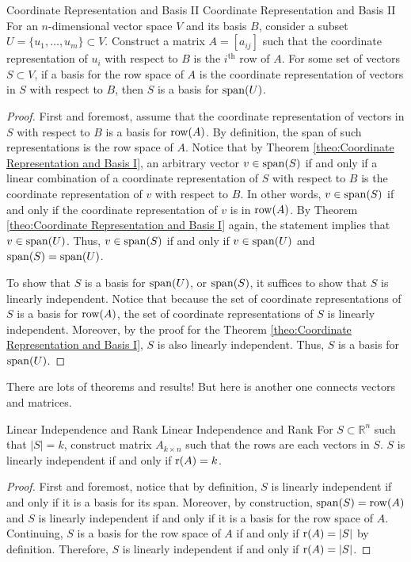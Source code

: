 \documentclass[../main.tex]{subfiles}
\begin{document}
\begin{theorem}{Coordinate Representation and Basis II}
{Coordinate Representation and Basis II}
For an $n$-dimensional vector space $V$ and its basis $B$, consider a
subset $U = \{ u_1, \ldots, u_m \} \subset V$. Construct a matrix
$A = [a_{ij}]$ such that the coordinate representation of $u_i$ with
respect to $B$ is the $i^{\text{th}}$ row of $A$. For some set of
vectors $S \subset V$, if a basis for the row space of $A$ is the
coordinate representation of vectors in $S$ with respect to $B$,
then $S$ is a basis for $\operatorname{span}(U)$.
\end{theorem}
\begin{proof}
First and foremost, assume that the coordinate representation of
vectors in $S$ with respect to $B$ is a basis for $\operatorname{row}(A)$.
By definition, the span of such representations is the row space
of $A$. Notice that by Theorem \ref{theo:Coordinate Representation and
Basis I}, an arbitrary vector $v \in \operatorname{span}(S)$ if and only if a linear
combination of a coordinate representation of $S$ with respect to $B$
is the coordinate representation of $v$ with respect to $B$. In other
words, $v \in \operatorname{span}(S)$ if and only if the coordinate representation
of $v$ is in $\operatorname{row}(A)$. By Theorem \ref{theo:Coordinate Representation
and Basis I} again, the statement implies that $v \in \operatorname{span}(U)$.
Thus, $v \in \operatorname{span}(S)$ if and only if $v \in \operatorname{span}(U)$ and $\operatorname{span}(S)
= \operatorname{span}(U)$.

To show that $S$ is a basis for $\operatorname{span}(U)$, or $\operatorname{span}(S)$, it suffices
to show that $S$ is linearly independent. Notice that because the set
of coordinate representations of $S$ is a basis for $\operatorname{row}(A)$, the set
of coordinate representations of $S$ is linearly independent.
Moreover, by the proof for the Theorem \ref{theo:Coordinate
Representation and Basis I}, $S$ is also linearly independent. Thus,
$S$ is a basis for $\operatorname{span}(U)$.
\end{proof}

There are lots of theorems and results! But here is another one
connects vectors and matrices.

\begin{theorem}{Linear Independence and Rank}
{Linear Independence and Rank}
For $S \subset \mathbb{R}^n$ such that $|S| = k$, construct matrix
$A_{k \times n}$ such that the rows are each vectors in $S$. $S$ is
linearly independent if and only if $\operatorname{r}(A) = k$.
\end{theorem}
\begin{proof}
First and foremost, notice that by definition, $S$ is linearly
independent if and only if it is a basis for its span. Moreover,
by construction, $\operatorname{span}(S) = \operatorname{row}(A)$ and $S$ is linearly
independent if and only if it is a basis for the row space of $A$.
Continuing, $S$ is a basis for the row space of $A$ if and only if
$\operatorname{r}(A) = |S|$ by definition. Therefore, $S$ is linearly independent
if and only if $\operatorname{r}(A) = |S|$.
\end{proof}
\end{document}
